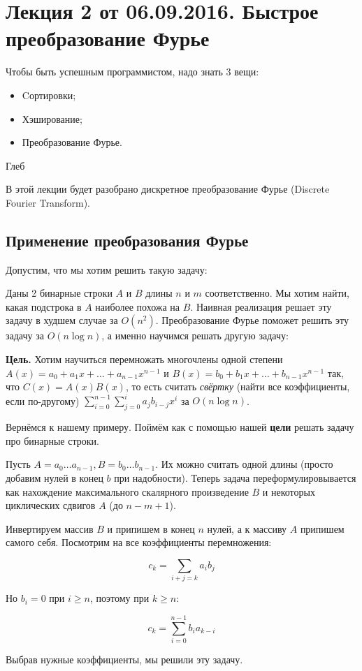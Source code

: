 \documentclass[a4paper, 12pt]{article}
\begin{document}
\pagestyle{fancy}

\section{Лекция 2 от 06.09.2016. Быстрое преобразование Фурье}
\epigraph{Чтобы быть успешным программистом, надо знать 3 вещи: 
\begin{itemize}
\item Cортировки;
\item Хэширование;
\item Преобразование Фурье.
\end{itemize}
\leavevmode}{Глеб}

В этой лекции будет разобрано дискретное преобразование Фурье (Discrete Fourier
Transform).

\subsection{Применение преобразования Фурье}

Допустим, что мы хотим решить такую задачу:

\begin{Examples}
  Даны 2 бинарные строки $A$ и $B$ длины $n$ и $m$ соответственно. Мы хотим найти, какая подстрока в $A$ наиболее
  похожа на $B$. Наивная реализация решает эту задачу в худшем случае за
  $O(n^2)$. Преобразование
  Фурье поможет решить эту задачу за $O(n\log n)$, а именно научимся решать другую
  задачу:

{\bf Цель.}
  Хотим научиться перемножать многочлены одной степени \newline $A(x) = a_0 + a_1x + \ldots + a_{n - 1}x^{n - 1}$
  и $B(x) = b_0 + b_1x + \ldots + b_{n - 1}x^{n - 1}$ так, что 
  $C(x) = A(x)B(x)$, то есть считать \textit{свёртку} (найти все коэффициенты, если по-другому) 
  $\sum\limits_{i = 0}^{n - 1} \sum\limits_{j = 0}^i a_jb_{i - j}x^i$ за $O(n\log n)$.

Вернёмся к нашему примеру. Поймём как с помощью нашей {\bf цели} решать задачу
про бинарные строки.

Пусть $A = a_0 \ldots a_{n - 1}, B = b_0\ldots b_{n - 1}$. Их можно считать одной длины
(просто добавим нулей в конец $b$ при надобности). Теперь задача 
переформулировывается как нахождение максимального скалярного произведение
$B$ и некоторых циклических сдвигов $A$ (до $n - m + 1$).

Инвертируем массив $B$ и припишем в конец $n$ нулей, а к массиву
$A$ припишем самого себя. Посмотрим на все коэффициенты перемножения:

\[
  c_k = \sum\limits_{i + j = k} a_ib_j
\]

Но $b_i = 0$ при $i \geqslant n$, поэтому при $k \geqslant n$:

\[
  c_k = \sum\limits_{i = 0}^{n - 1} b_ia_{k - i}
\]

Выбрав нужные коэффициенты, мы решили эту задачу.

\end{Examples}
\end{document}
